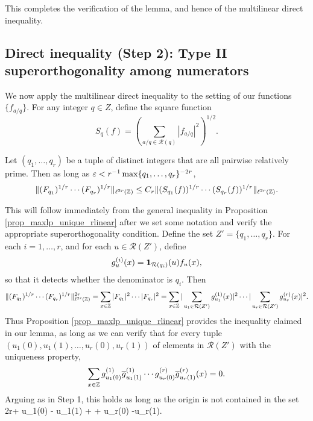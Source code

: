 \documentclass[oneside,11pt]{amsart}
\newcommand{\Rcal}{\mathcal{R}}
\begin{document}
This completes the verification of the lemma, and hence of the multilinear direct inequality.










\subsection{Direct inequality (Step 2): Type II superorthogonality among numerators}
We now apply the multilinear direct inequality to the setting of our functions $\{f_{a/q}\}$.
For any integer $q \in Z$, define the square function  
  \[S_q(f) = (\sum_{a/q \in \Rcal(q)} |f_{a/q}|^2)^{1/2}.\]
  

  \begin{lemma}\label{lemma_RdF_L4_orthog_numer'}
Let $(q_1,\ldots, q_r)$ be a tuple of distinct integers that are all pairwise relatively prime. Then as long as $\varepsilon< r^{-1}\max\{q_1,\ldots,q_r\}^{-2r}$,
\[ 
\| (F_{q_1})^{1/r} \cdots ( F_{q_r})^{1/r} \|_{\ell^{2r}(\mathbb{Z})} \leq C_r \| (S_{q_1}(f))^{1/r}\cdots (S_{q_r}(f))^{1/r} \|_{\ell^{2r}(\mathbb{Z})}.
\]
\end{lemma}
 

This will follow immediately from  the general inequality in Proposition \ref{prop_maxlp_unique_rlinear}  after we set some notation and verify the appropriate superorthogonality condition.
Define the set $Z' = \{q_1,\ldots, q_r\}$. 
For each $i =1,\ldots, r$, and for each  $u \in \Rcal(Z')$, define 
 \[
 g^{(i)}_u (x) = \onebf_{\Rcal(q_i)}(u)f_{u}(x),
 \]
 so that it detects whether the denominator is $q_i$.
 Then 
\[ 
\| (F_{q_1})^{1/r} \cdots ( F_{q_r})^{1/r} \|^{2r}_{\ell^{2r}(\Z)}
= \sum_{x\in \Z}  |F_{q_1}|^2 \cdots |F_{q_r}|^2 =  \sum_{x\in \Z}  |\sum_{u_1 \in \Rcal(Z')} g^{(1)}_{u_1}(x)|^2 \cdots |\sum_{u_r\in \Rcal(Z')} g^{(r)}_{u_r}(x)|^2.
\]
Thus Proposition \ref{prop_maxlp_unique_rlinear}  provides the inequality claimed in our lemma, as long as 
we can verify that for every tuple $(u_1(0),u_1(1),\ldots, u_{r}(0),u_r(1))$ of elements in $\Rcal(Z')$ with the uniqueness property,
\[ \sum_{x \in \mathbb{Z}} g^{(1)}_{u_1(0)} \overline{g}^{(1)}_{u_1(1)} \cdots  g^{(r)}_{u_{r}(0)} \overline{g}^{(r)}_{u_r(1)}(x) =0.\]
Arguing as in Step 1, this holds as long as the origin is not contained in the set 
\beq\label{RdF_L4_set_v2}
 2r\ep \Qbf + u_1(0) - u_1(1) + \cdots + u_{r}(0) -u_{r}(1).
 \eeq
\end{document}

